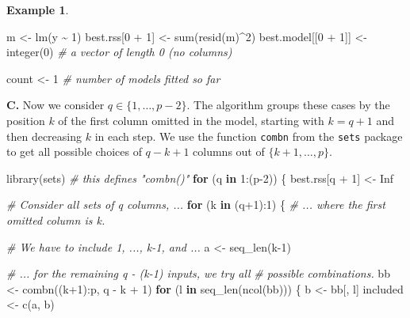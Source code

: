 \documentclass[
  a4paper,
]{article}
\newenvironment{Shaded}{\begin{snugshade}}{\end{snugshade}}
\newcommand{\CommentTok}[1]{\textcolor[rgb]{0.56,0.35,0.01}{\textit{#1}}}
\newcommand{\ConstantTok}[1]{\textcolor[rgb]{0.00,0.00,0.00}{#1}}
\newcommand{\ControlFlowTok}[1]{\textcolor[rgb]{0.13,0.29,0.53}{\textbf{#1}}}
\newcommand{\DecValTok}[1]{\textcolor[rgb]{0.00,0.00,0.81}{#1}}
\newcommand{\FunctionTok}[1]{\textcolor[rgb]{0.00,0.00,0.00}{#1}}
\newcommand{\NormalTok}[1]{#1}
\newcommand{\OtherTok}[1]{\textcolor[rgb]{0.56,0.35,0.01}{#1}}
\newcommand{\SpecialCharTok}[1]{\textcolor[rgb]{0.00,0.00,0.00}{#1}}
\theoremstyle{definition}
\theoremstyle{definition}
\newtheorem{example}{Example}[section]
\theoremstyle{definition}
\theoremstyle{definition}
\theoremstyle{remark}
\begin{document}
\begin{example}
\begin{Shaded}
\begin{Highlighting}[]
\NormalTok{m }\OtherTok{\textless{}{-}} \FunctionTok{lm}\NormalTok{(y }\SpecialCharTok{\textasciitilde{}} \DecValTok{1}\NormalTok{)}
\NormalTok{best.rss[}\DecValTok{0} \SpecialCharTok{+} \DecValTok{1}\NormalTok{] }\OtherTok{\textless{}{-}} \FunctionTok{sum}\NormalTok{(}\FunctionTok{resid}\NormalTok{(m)}\SpecialCharTok{\^{}}\DecValTok{2}\NormalTok{)}
\NormalTok{best.model[[}\DecValTok{0} \SpecialCharTok{+} \DecValTok{1}\NormalTok{]] }\OtherTok{\textless{}{-}} \FunctionTok{integer}\NormalTok{(}\DecValTok{0}\NormalTok{) }\CommentTok{\# a vector of length 0 (no columns)}

\NormalTok{count }\OtherTok{\textless{}{-}} \DecValTok{1} \CommentTok{\# number of models fitted so far}
\end{Highlighting}
\end{Shaded}

\textbf{C.} Now we consider \(q \in \{1, \ldots, p-2\}\). The algorithm groups
these cases by the position \(k\) of the first column omitted in the model,
starting with \(k = q+1\) and then decreasing \(k\) in each step.
We use the function \texttt{combn} from the \texttt{sets} package
to get all possible choices of
\(q - k + 1\) columns out of \(\{k+1, \ldots, p\}\).

\begin{Shaded}
\begin{Highlighting}[]
\FunctionTok{library}\NormalTok{(sets) }\CommentTok{\# this defines "combn()"}
\ControlFlowTok{for}\NormalTok{ (q }\ControlFlowTok{in} \DecValTok{1}\SpecialCharTok{:}\NormalTok{(p}\DecValTok{{-}2}\NormalTok{)) \{}
\NormalTok{    best.rss[q }\SpecialCharTok{+} \DecValTok{1}\NormalTok{] }\OtherTok{\textless{}{-}} \ConstantTok{Inf}

    \CommentTok{\# Consider all sets of q columns, ...}
    \ControlFlowTok{for}\NormalTok{ (k }\ControlFlowTok{in}\NormalTok{ (q}\SpecialCharTok{+}\DecValTok{1}\NormalTok{)}\SpecialCharTok{:}\DecValTok{1}\NormalTok{) \{}
        \CommentTok{\# ... where the first omitted column is k.}

        \CommentTok{\# We have to include 1, ..., k{-}1, and ...}
\NormalTok{        a }\OtherTok{\textless{}{-}} \FunctionTok{seq\_len}\NormalTok{(k}\DecValTok{{-}1}\NormalTok{)}

        \CommentTok{\# ... for the remaining q {-} (k{-}1) inputs, we try all}
        \CommentTok{\# possible combinations.}
\NormalTok{        bb }\OtherTok{\textless{}{-}} \FunctionTok{combn}\NormalTok{((k}\SpecialCharTok{+}\DecValTok{1}\NormalTok{)}\SpecialCharTok{:}\NormalTok{p, q }\SpecialCharTok{{-}}\NormalTok{ k }\SpecialCharTok{+} \DecValTok{1}\NormalTok{)}
        \ControlFlowTok{for}\NormalTok{ (l }\ControlFlowTok{in} \FunctionTok{seq\_len}\NormalTok{(}\FunctionTok{ncol}\NormalTok{(bb))) \{}
\NormalTok{            b }\OtherTok{\textless{}{-}}\NormalTok{ bb[, l]}
\NormalTok{            included }\OtherTok{\textless{}{-}} \FunctionTok{c}\NormalTok{(a, b)}


\end{Highlighting}
\end{Shaded}
\end{example}
\end{document}
